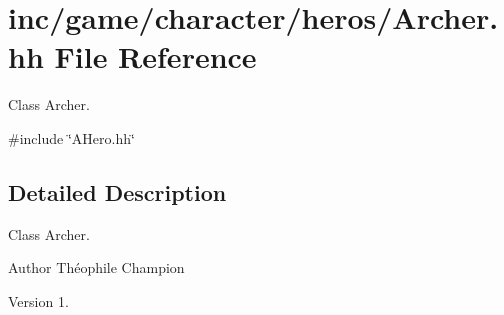 \hypertarget{Archer_8hh}{}\section{inc/game/character/heros/\+Archer.hh File Reference}
\label{Archer_8hh}


Class Archer.  


{\ttfamily \#include \char`\"{}A\+Hero.\+hh\char`\"{}}\newline


\subsection{Detailed Description}
Class Archer. 

\begin{DoxyAuthor}{Author}
Théophile Champion 
\end{DoxyAuthor}
\begin{DoxyVersion}{Version}
1. 
\end{DoxyVersion}
